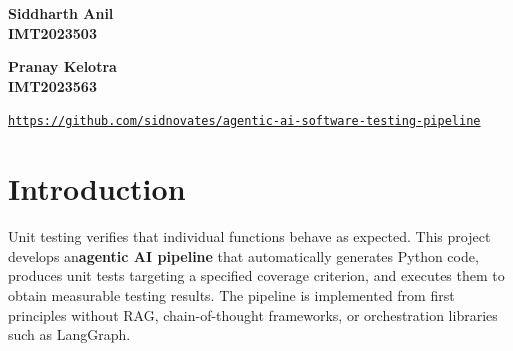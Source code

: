 \documentclass[12pt, a4paper]{article}
\begin{document}
\begin{titlepage}
\begin{center}
\begin{minipage}{0.44\linewidth}
\begin{tcolorbox}[
  enhanced, colback=white, colframe=AccentA!30, boxrule=0.5pt, arc=4pt,
  borderline west={4pt}{0pt}{AccentA}, drop shadow=black!15,
  halign=left, left=10pt
]
{\large\bfseries\color{SectionColor} Siddharth Anil}\\[1mm]
{\color{AccentB}\bfseries IMT2023503}
\end{tcolorbox}
\end{minipage}\hspace{6mm}
\begin{minipage}{0.44\linewidth}
\begin{tcolorbox}[
  enhanced, colback=white, colframe=AccentA!30, boxrule=0.5pt, arc=4pt,
  borderline west={4pt}{0pt}{AccentA}, drop shadow=black!15,
  halign=left, left=10pt
]
{\large\bfseries\color{SectionColor} Pranay Kelotra}\\[1mm]
{\color{AccentB}\bfseries IMT2023563}
\end{tcolorbox}
\end{minipage}

 \vspace{35mm}
\begin{tcolorbox}[
  enhanced, width=0.92\linewidth,
  colback=white, colframe=AccentA!30, boxrule=0.5pt, arc=4pt,
  borderline west={4pt}{0pt}{AccentA}, drop shadow=black!15,
  halign=center, left=6pt, right=6pt, top=5pt, bottom=5pt
]
\href{https://github.com/sidnovates/agentic-ai-software-testing-pipeline}{\texttt{\footnotesize https://github.com/sidnovates/agentic-ai-software-testing-pipeline}}
\end{tcolorbox}

 
\end{center}
\end{titlepage}
\tableofcontents
\newpage

\section{Introduction}

Unit testing verifies that individual functions behave as expected. This project develops an\textbf{agentic AI pipeline} that automatically generates Python code, produces unit tests targeting a specified coverage criterion, and executes them to obtain measurable testing results. The pipeline is implemented from first principles without RAG, chain-of-thought frameworks, or orchestration libraries such as LangGraph.
\end{document}
